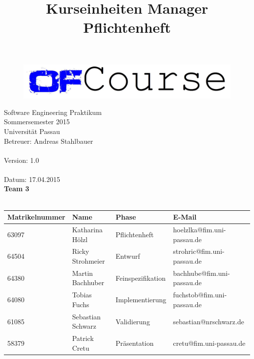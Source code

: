 \documentclass[a4paper]{scrreprt}
\begin{document}
	\thispagestyle{plain}

\begin{titlepage}
    \begin{center}
\begin{figure}[th]
\centering
\includegraphics[width=0.6\linewidth]{logo/name_blau_ofCourse.jpg}
\end{figure}

    	\begin{title}
        	\title{\Huge{\textbf{Kurseinheiten Manager \\ Pflichtenheft\\}}}

		\end{title}
		\hspace{3cm}

        	Software Engineering Praktikum \\
        	Sommersemester 2015\\
        	Universität Passau\\


        	Betreuer: Andreas Stahlbauer\\
        	\hspace{1,5cm}\\
        	Version: 1.0 \\
        	\hspace{1,5cm}\\
        	Datum: 17.04.2015\\[50pt]
        	\textbf{Team 3} \\
            \ \\
    
        
        
        \begin{tabular}{ | l | l | l | l |}
            \hline
            \textbf{Matrikelnummer} & \textbf{Name} & \textbf{Phase} & \textbf{E-Mail}  \\ \hline
            63097 & Katharina Hölzl & Pflichtenheft & hoelzlka@fim.uni-passau.de \\ \hline
            64504 & Ricky Strohmeier& Entwurf & strohric@fim.uni-passau.de  \\ \hline
            64380 & Martin Bachhuber & Feinspezifikation  & bachhube@fim.uni-passau.de \\ \hline
            64080 & Tobias Fuchs & Implementierung  &  fuchstob@fim.uni-passau.de\\ \hline
            61085 & Sebastian Schwarz & Validierung & sebastian@nrschwarz.de \\ \hline  
            58379 & Patrick Cretu  &  Präsentation & cretu@fim.uni-passau.de \\ \hline
        \end{tabular}
        

\end{center}
\end{titlepage}
\end{document}
